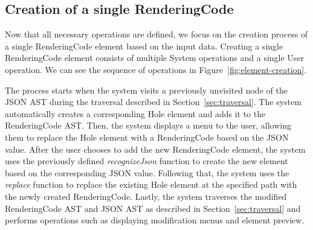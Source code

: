 \subsection{Creation of a single RenderingCode}

Now that all necessary operations are defined, we focus on the creation process of a single RenderingCode element based on the input data.
Creating a single RenderingCode element consists of multiple System operations and a single User operation.
We can see the sequence of operations in Figure~\ref{fig:element-creation}.

The process starts when the system visits a previously unvisited node of the JSON AST during the traversal described in Section~\ref{sec:traversal}.
The system automatically creates a corresponding Hole element and adds it to the RenderingCode AST.
Then, the system displays a menu to the user, allowing them to replace the Hole element with a RenderingCode based on the JSON value.
After the user chooses to add the new RenderingCode element, the system uses the previously defined \emph{recognizeJson} function to create the new element based on the corresponding JSON value.
Following that, the system uses the \emph{replace} function to replace the existing Hole element at the specified path with the newly created RenderingCode.
Lastly, the system traverses the modified RenderingCode AST and JSON AST as described in Section~\ref{sec:traversal} and performs operations such as displaying modification menus and element preview.

